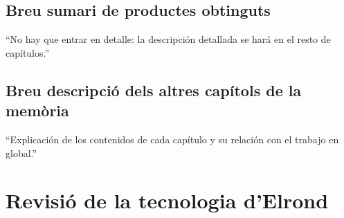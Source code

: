 \documentclass[11pt,a4paper]{article}
\begin{document}
\subsection{Breu sumari de productes obtinguts}
``No hay que entrar en detalle: la descripción detallada se hará en el resto de capítulos.'' 
\medskip 

\subsection{Breu descripció dels altres capítols de la memòria}
``Explicación de los contenidos de cada capítulo y su relación con el trabajo en global.''

\newpage 

\section{Revisió de la tecnologia d'Elrond}
\end{document}
